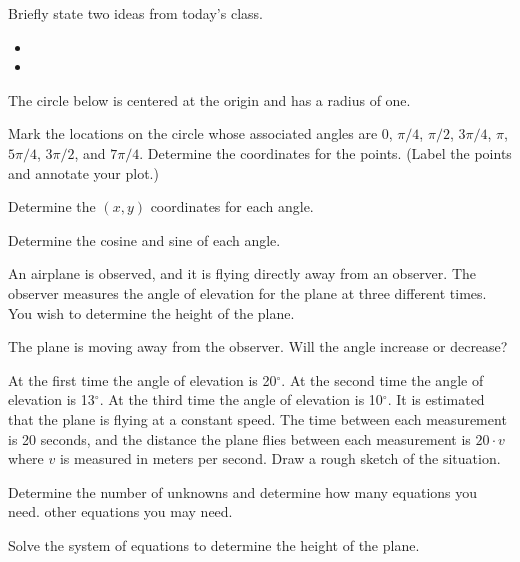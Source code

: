 \begin{problem}
\item Briefly state two ideas from today's class.
  \begin{itemize}
  \item
  \item
  \end{itemize}
  \item The circle below is centered at the origin and has a radius of
    one.


    \begin{subproblem}
    \item Mark the locations on the circle whose associated angles are
      0, $\pi/4$, $\pi/2$, $3\pi/4$, $\pi$, $5\pi/4$, $3\pi/2$, and
      $7\pi/4$.
      Determine the coordinates for the points.
      (Label the points and annotate your plot.)
    \item Determine the $(x,y)$ coordinates for each angle.
    \item Determine the cosine and sine of each angle.
    \end{subproblem}
  \item An airplane is observed, and it is flying directly away from an observer.
      The observer measures the angle of elevation for the plane at three different
      times. You wish to determine the height of the plane.
      \begin{subproblem}
        \item The plane is moving away from the observer. Will the angle increase
          or decrease?
        \item At the first time the angle of elevation is 20$^\circ$.
          At the second time the angle of elevation is 13$^\circ$.
          At the third time the angle of elevation is 10$^\circ$.
          It is estimated that the plane is flying at a constant speed.
          The time between each measurement is 20 seconds, and the distance
          the plane flies between each measurement is $20\cdot v$ where $v$
          is measured in meters per second.
          Draw a rough sketch of the situation.
          \vfill
          \item Determine the number of unknowns and determine how many equations you need.
            \vspace{1em}
          other equations you may need.
          \vfill
        \item Solve the system of equations to determine the height of the plane.
          \vfill
          \vfill
      \end{subproblem}
\end{problem}


